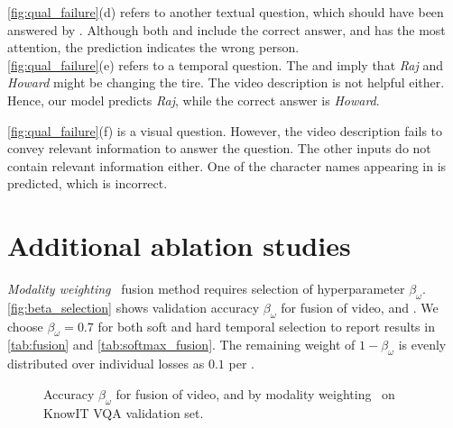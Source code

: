 \documentclass[10pt,twocolumn,letterpaper]{article}
\makeatletter
\renewcommand\paragraph{\@startsection{paragraph}{4}{\z@}{1ex}{-1em}{\normalfont\normalsize\bfseries}}
\makeatother
\begin{document}
\autoref{fig:qual_failure}(d) refers to another textual question, which should have been answered by \sceneSum. Although both \sceneSum and \episodeSum include the correct answer, and \episodeSum has the most attention, the prediction indicates the wrong person.\\

\autoref{fig:qual_failure}(e) refers to a temporal question. The \sceneSum and \episodeSum imply that \emph{Raj} and \emph{Howard} might be changing the tire. The video description is not helpful either. Hence, our model predicts \emph{Raj}, while the correct answer is \emph{Howard}.

\autoref{fig:qual_failure}(f) is a visual question. However, the video description fails to convey relevant information to answer the question. The other inputs do not contain relevant information either. One of the character names appearing in \episodeSum is predicted, which is incorrect.



\section{Additional ablation studies}
\label{sec:add-ablation}

\paragraph{Hyperparameter validation}

\emph{Modality weighting}~\cite{garcia2020knowledge} fusion method requires selection of hyperparameter $\beta_{\omega}$. \autoref{fig:beta_selection} shows validation accuracy \vs $\beta_\omega$ for fusion of video, \sceneSum and \episodeSum. We choose $\beta_{\omega} = 0.7$ for both soft and hard temporal selection to report results in \autoref{tab:fusion} and \autoref{tab:softmax_fusion}. The remaining weight of $1-\beta_{\omega}$ is evenly distributed over individual \branch losses as $0.1$ per \branch.

\begin{figure}
\centering
\small
{}
\caption{Accuracy \vs $\beta_\omega$ for fusion of video, \sceneSum and \episodeSum by modality weighting~\cite{garcia2020knowledge} on KnowIT VQA validation set.}
\label{fig:beta_selection}
\end{figure}
\end{document}
